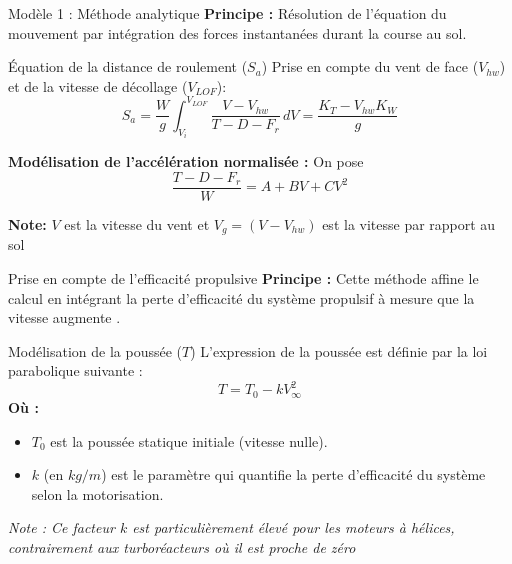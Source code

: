 	
		\begin{frame}{Modèle 1 : Méthode analytique }
			\textbf{Principe :} Résolution de l'équation du mouvement par intégration des forces instantanées durant la course au sol.
			\vspace*{0.5cm}
			\begin{block}{Équation de la distance de roulement ($S_a$)}
				Prise en compte du vent de face ($V_{hw}$) et de la vitesse de décollage ($V_{LOF}$):
				\[ S_a = \frac{W}{g} \int_{V_i}^{V_{LOF}} \frac{V - V_{hw}}{T - D - F_r} \, dV = \frac{K_T - V_{hw} K_W}{g}  \]
				
				\textbf{Modélisation de l'accélération normalisée :}
				On pose \[  \frac{T - D - F_r}{W} = A + BV + CV^2    \]
				
			\end{block}
			\textbf{Note: } $ V $ est la vitesse du vent et $ V_g = (V - V_{hw}) $ est la vitesse par rapport au sol
		
		\end{frame}
		
		\begin{frame}{Prise en compte de l'efficacité propulsive}
			\textbf{Principe :} Cette méthode affine le calcul en intégrant la perte d'efficacité du système propulsif à mesure que la vitesse augmente .
			
			\vspace*{0.5cm}
			
			\begin{block}{Modélisation de la poussée ($T$)}
				L'expression de la poussée est définie par la loi parabolique suivante :
				\[ T = T_0 - k V_{\infty}^{2} \]
				\textbf{Où :}
				\begin{itemize}
					\item $T_0$ est la poussée statique initiale (vitesse nulle).
					\item $k$ (en $kg/m$) est le paramètre qui quantifie la perte d'efficacité du système selon la motorisation.
				\end{itemize}
			\end{block}
			
			\textit{Note : Ce facteur $k$ est particulièrement élevé pour les moteurs à hélices, contrairement aux turboréacteurs où il est proche de zéro }
		\end{frame}
		
	
		
		
		
